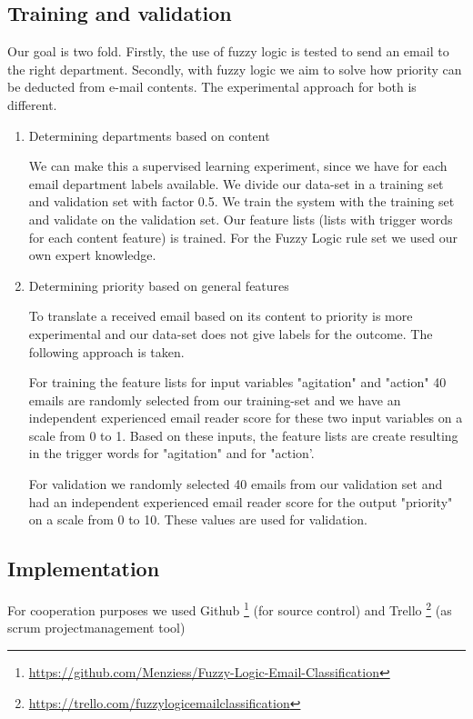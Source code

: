 \documentclass[journal]{IEEEtran}
\begin{document}
\subsection{Training and validation}

Our goal is two fold. Firstly, the use of fuzzy logic is tested to send an email to the right department. Secondly, with fuzzy logic we aim to solve how priority can be deducted from e-mail contents. The experimental approach for both is different. 

\begin{enumerate}
    \item{Determining departments based on content}

    We can make this a supervised learning experiment, since we have for each email department labels available. We divide our data-set in a training set and validation set with factor 0.5. We train the system with the training set and validate on the validation set. Our feature lists (lists with trigger words for each content feature) is trained. For the Fuzzy Logic rule set we used our own expert knowledge.

    \item{Determining priority based on general features}

    To translate a received email based on its content to priority is more experimental and our data-set does not give labels for the outcome. The following approach is taken. 

    For training the feature lists for input variables "agitation" and "action" 40 emails are randomly selected from our training-set and we have an independent experienced email reader score for these two input variables on a scale from 0 to 1. Based on these inputs, the feature lists are create resulting in the trigger words for "agitation" and for "action'. 

    For validation we randomly selected 40 emails from our validation set and had an independent experienced email reader score for the output "priority" on a scale from 0 to 10. These values are used for validation.

\end{enumerate}

\subsection{Implementation}
For cooperation purposes we used Github \footnote{\url{https://github.com/Menziess/Fuzzy-Logic-Email-Classification}} (for source control) and Trello \footnote{\url{https://trello.com/fuzzylogicemailclassification}} (as scrum projectmanagement tool)
\end{document}
